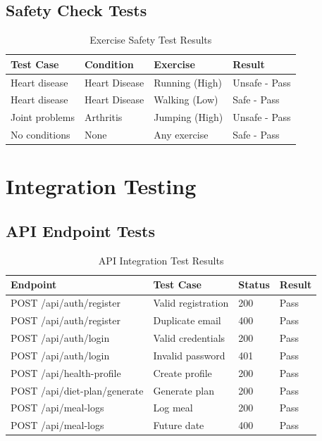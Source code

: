\subsection{Safety Check Tests}

\begin{table}[H]
\centering
\begin{tabular}{|p{3cm}|p{4cm}|p{3cm}|l|}
\hline
\textbf{Test Case} & \textbf{Condition} & \textbf{Exercise} & \textbf{Result} \\
\hline
Heart disease & Heart Disease & Running (High) & Unsafe - Pass \\
Heart disease & Heart Disease & Walking (Low) & Safe - Pass \\
Joint problems & Arthritis & Jumping (High) & Unsafe - Pass \\
No conditions & None & Any exercise & Safe - Pass \\
\hline
\end{tabular}
\caption{Exercise Safety Test Results}
\end{table}

\section{Integration Testing}

\subsection{API Endpoint Tests}

\begin{table}[H]
\centering
\begin{tabular}{|p{4cm}|p{4cm}|l|l|}
\hline
\textbf{Endpoint} & \textbf{Test Case} & \textbf{Status} & \textbf{Result} \\
\hline
POST /api/auth/register & Valid registration & 200 & Pass \\
POST /api/auth/register & Duplicate email & 400 & Pass \\
POST /api/auth/login & Valid credentials & 200 & Pass \\
POST /api/auth/login & Invalid password & 401 & Pass \\
POST /api/health-profile & Create profile & 200 & Pass \\
POST /api/diet-plan/generate & Generate plan & 200 & Pass \\
POST /api/meal-logs & Log meal & 200 & Pass \\
POST /api/meal-logs & Future date & 400 & Pass \\
\hline
\end{tabular}
\caption{API Integration Test Results}
\end{table}

